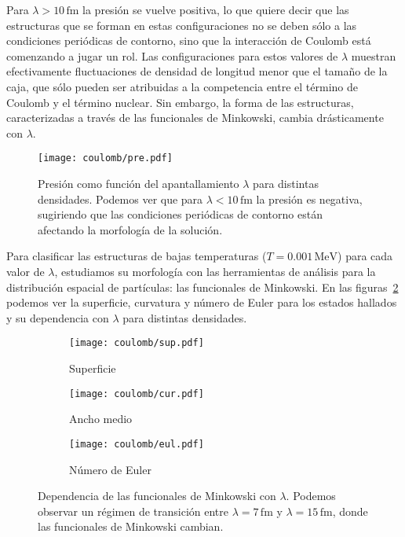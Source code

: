 Para $\lambda>10\,\text{fm}$ la presión se vuelve positiva, lo que quiere decir que las estructuras que se forman en estas configuraciones no se deben sólo a las condiciones periódicas de contorno, sino que la interacción de Coulomb está comenzando a jugar un rol.
Las configuraciones para estos valores de $\lambda$ muestran efectivamente fluctuaciones de densidad de longitud menor que el tamaño de la caja, que sólo pueden ser atribuidas a la competencia entre el término de Coulomb y el término nuclear.
Sin embargo, la forma de las estructuras, caracterizadas a través de las funcionales de Minkowski, cambia drásticamente con $\lambda$.

\begin{figure}[h!]  \centering
\centering
\texttt{[image: coulomb/pre.pdf]}
\caption{Presión como función del apantallamiento $\lambda$ para distintas densidades.
  Podemos ver que para $\lambda<10\,\text{fm}$ la presión es negativa, sugiriendo que las condiciones periódicas de contorno están afectando la morfología de la solución.}
\label{fig:pre}
\end{figure}

Para clasificar las estructuras de bajas temperaturas ($T=0.001\,\text{MeV}$) para cada valor de $\lambda$, estudiamos su morfología con las herramientas de análisis para la distribución espacial de partículas: las funcionales de Minkowski.
En las figuras~\ref{fig:minkowski} podemos ver la superficie, curvatura y número de Euler para los estados hallados y su dependencia con $\lambda$ para distintas densidades.

\begin{figure}[h!]  %
\centering
\begin{subfigure}[h!]{0.45\columnwidth}
  \centering
  \texttt{[image: coulomb/sup.pdf]}
  \caption{Superficie}
\end{subfigure}
\begin{subfigure}[h!]{0.45\columnwidth}
  \centering
  \texttt{[image: coulomb/cur.pdf]}
  \caption{Ancho medio}
\end{subfigure}
\begin{subfigure}[h!]{0.45\columnwidth}
  \centering
  \texttt{[image: coulomb/eul.pdf]}
  \caption{Número de Euler}
\end{subfigure}
\caption{Dependencia de las funcionales de Minkowski con $\lambda$.
  Podemos observar un régimen de transición entre $\lambda=7\,\text{fm}$ y $\lambda=15\,\text{fm}$, donde las funcionales de Minkowski cambian.}
\label{fig:minkowski}
\end{figure}

